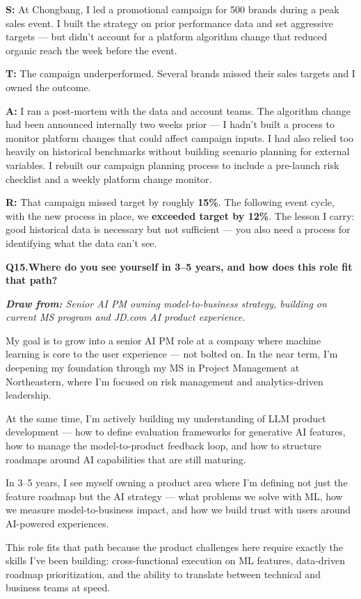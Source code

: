 \documentclass[10pt, letterpaper]{article}
\newcommand{\q}[2]{%
    \smallskip
    \noindent\textbf{\small Q#1.}\quad\textbf{#2}
    \vspace{3pt}
}
\newcommand{\hint}[1]{%
    \begin{notebox}
    \footnotesize\textit{\textbf{Draw from:} #1}
    \end{notebox}
}
\newcommand{\s}[1]{\textbf{\textcolor{starlabel}{S:}} #1}
\newcommand{\ta}[1]{\textbf{\textcolor{starlabel}{T:}} #1}
\newcommand{\ac}[1]{\textbf{\textcolor{starlabel}{A:}} #1}
\newcommand{\res}[1]{\textbf{\textcolor{starlabel}{R:}} #1}
\begin{document}
\begin{answerbox}
\footnotesize
\s{At Chongbang, I led a promotional campaign for 500 brands during a peak sales event. I built the strategy on prior performance data and set aggressive targets --- but didn't account for a platform algorithm change that reduced organic reach the week before the event.}

\medskip
\ta{The campaign underperformed. Several brands missed their sales targets and I owned the outcome.}

\medskip
\ac{I ran a post-mortem with the data and account teams. The algorithm change had been announced internally two weeks prior --- I hadn't built a process to monitor platform changes that could affect campaign inputs. I had also relied too heavily on historical benchmarks without building scenario planning for external variables. I rebuilt our campaign planning process to include a pre-launch risk checklist and a weekly platform change monitor.}

\medskip
\res{That campaign missed target by roughly \textbf{15\%}. The following event cycle, with the new process in place, we \textbf{exceeded target by 12\%}. The lesson I carry: good historical data is necessary but not sufficient --- you also need a process for identifying what the data can't see.}
\end{answerbox}

\q{15}{Where do you see yourself in 3--5 years, and how does this role fit that path?}
\hint{Senior AI PM owning model-to-business strategy, building on current MS program and JD.com AI product experience.}

\begin{answerbox}
\footnotesize
My goal is to grow into a senior AI PM role at a company where machine learning is core to the user experience --- not bolted on. In the near term, I'm deepening my foundation through my MS in Project Management at Northeastern, where I'm focused on risk management and analytics-driven leadership.

\medskip
At the same time, I'm actively building my understanding of LLM product development --- how to define evaluation frameworks for generative AI features, how to manage the model-to-product feedback loop, and how to structure roadmaps around AI capabilities that are still maturing.

\medskip
In 3--5 years, I see myself owning a product area where I'm defining not just the feature roadmap but the AI strategy --- what problems we solve with ML, how we measure model-to-business impact, and how we build trust with users around AI-powered experiences.

\medskip
This role fits that path because the product challenges here require exactly the skills I've been building: cross-functional execution on ML features, data-driven roadmap prioritization, and the ability to translate between technical and business teams at speed.
\end{answerbox}
\end{document}
